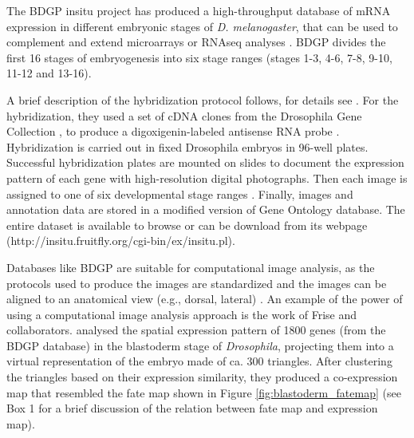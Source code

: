 The BDGP insitu project has produced a high-throughput database of mRNA expression in different embryonic stages of \textit{D. melanogaster}, that can be used to complement and extend microarrays or RNAseq analyses \citep{Tomancak2002}. 
BDGP divides the first 16 stages of embryogenesis into six stage ranges (stages 1-3, 4-6, 7-8, 9-10, 11-12 and 13-16).

A brief description of the hybridization protocol follows, for details see \citep{Tomancak2002}.
For the hybridization, they used a set of cDNA clones from the Drosophila Gene Collection \citep{Stapleton2002}, to produce a digoxigenin-labeled antisense RNA probe \citep{Tomancak2002}.
Hybridization is carried out in fixed Drosophila embryos in 96-well plates. Successful hybridization plates are mounted on slides to document the expression pattern of each gene with high-resolution digital photographs. Then each image is assigned to one of six developmental stage ranges \citep{Weiszmann2009a}.
%
Finally, images and annotation data are stored in a modified version of Gene Ontology database. The entire dataset is available to browse or can be download from its webpage (http://insitu.fruitfly.org/cgi-bin/ex/insitu.pl).

Databases like BDGP are suitable for computational image analysis, as the protocols used to produce the images are standardized \citep{Tomancak2002} and the images can be aligned to an anatomical view (e.g., dorsal, lateral) \citep{Kumar2011}.
An example of the power of using a computational image analysis approach is the work of Frise and collaborators.
\citet{Frise2010} analysed the spatial expression pattern of 1800 genes (from the BDGP database) in the blastoderm stage of \textit{Drosophila}, projecting them into a virtual representation of the embryo made of ca. 300 triangles.
After clustering the triangles based on their expression similarity, they produced a co-expression map that resembled the fate map shown in Figure \ref{fig:blastoderm_fatemap} (see Box 1 for a brief discussion of the relation between fate map and expression map).

